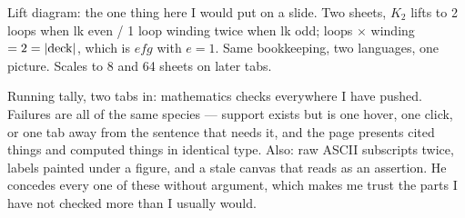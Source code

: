 



\begin{knote}
Lift diagram: the one thing here I would put on a slide. Two sheets, $K_2$ lifts to 2 loops when lk even / 1 loop winding twice when lk odd; loops $\times$ winding $= 2 = |{\rm deck}|$, which is $efg$ with $e=1$. Same bookkeeping, two languages, one picture. Scales to 8 and 64 sheets on later tabs.

Running tally, two tabs in: mathematics checks everywhere I have pushed. Failures are all of the same species --- support exists but is one hover, one click, or one tab away from the sentence that needs it, and the page presents cited things and computed things in identical type. Also: raw ASCII subscripts twice, labels painted under a figure, and a stale canvas that reads as an assertion. He concedes every one of these without argument, which makes me trust the parts I have not checked more than I usually would.
\end{knote}